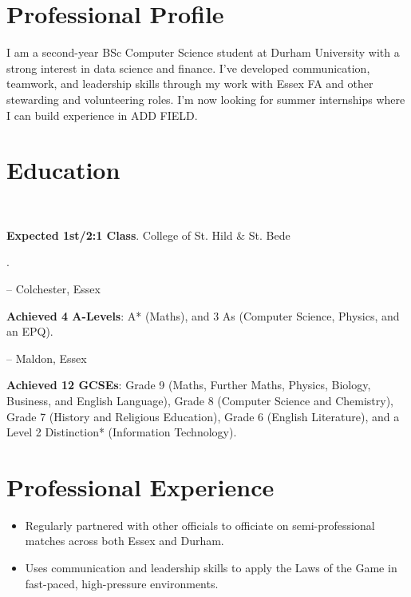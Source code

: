 \section*{Professional Profile}

\noindent I am a second-year BSc Computer Science student at Durham University with a strong interest in data science and finance. I've developed communication, teamwork, and leadership skills through my work with Essex FA and other stewarding and volunteering roles. I'm now looking for summer internships where I can build experience in \color{red}ADD FIELD\color{black}.

\section*{Education}

\\\begin{small}\textbf{Expected 1st/2:1 Class}. College of St. Hild $\&$ St. Bede\end{small}.

 -- Colchester, Essex
\\\begin{small}\textbf{Achieved 4 A-Levels}: A* (Maths), and 3 As (Computer Science, Physics, and an EPQ).\end{small}

 -- Maldon, Essex
\\\begin{small}\textbf{Achieved 12 GCSEs}: Grade 9 (Maths, Further Maths, Physics, Biology, Business, and English Language), Grade 8 (Computer Science and Chemistry), Grade 7 (History and Religious Education), Grade 6 (English Literature), and a Level 2 Distinction* (Information Technology).\end{small}

\section*{Professional Experience}

\begin{itemize}
    \item Regularly partnered with other officials to officiate on semi-professional matches across both Essex and Durham.
    \item Uses communication and leadership skills to apply the Laws of the Game in fast-paced, high-pressure environments.
\end{itemize}

